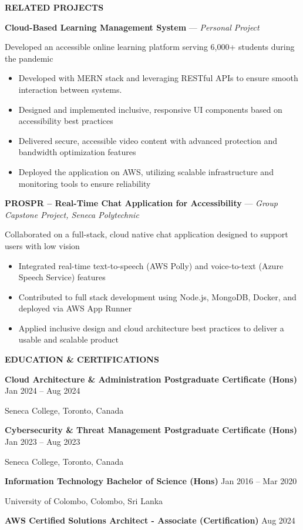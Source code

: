 \documentclass[10pt,letterpaper]{article}
\begin{document}
\vspace{3pt}

\textbf{RELATED PROJECTS}

\vspace{1pt}

\textbf{Cloud-Based Learning Management System} --- \textit{Personal Project}

\vspace{1pt}

Developed an accessible online learning platform serving 6,000+ students during the pandemic

\begin{itemize}
\item Developed with MERN stack and leveraging RESTful APIs to ensure smooth interaction between systems.
\item Designed and implemented inclusive, responsive UI components based on accessibility best practices
\item Delivered secure, accessible video content with advanced protection and bandwidth optimization features
\item Deployed the application on AWS, utilizing scalable infrastructure and monitoring tools to ensure reliability
\end{itemize}

\textbf{PROSPR -- Real-Time Chat Application for Accessibility} --- \textit{Group Capstone Project, Seneca Polytechnic}

\vspace{1pt}

Collaborated on a full-stack, cloud native chat application designed to support users with low vision

\begin{itemize}
\item Integrated real-time text-to-speech (AWS Polly) and voice-to-text (Azure Speech Service) features
\item Contributed to full stack development using Node.js, MongoDB, Docker, and deployed via AWS App Runner
\item Applied inclusive design and cloud architecture best practices to deliver a usable and scalable product
\end{itemize}

\vspace{3pt}

\textbf{EDUCATION \& CERTIFICATIONS}

\vspace{1pt}

\textbf{Cloud Architecture \& Administration Postgraduate Certificate (Hons)} \hfill Jan 2024 -- Aug 2024

Seneca College, Toronto, Canada

\textbf{Cybersecurity \& Threat Management Postgraduate Certificate (Hons)} \hfill Jan 2023 -- Aug 2023

Seneca College, Toronto, Canada

\textbf{Information Technology Bachelor of Science (Hons)} \hfill Jan 2016 -- Mar 2020

University of Colombo, Colombo, Sri Lanka

\textbf{AWS Certified Solutions Architect - Associate (Certification)} \hfill Aug 2024
\end{document}
